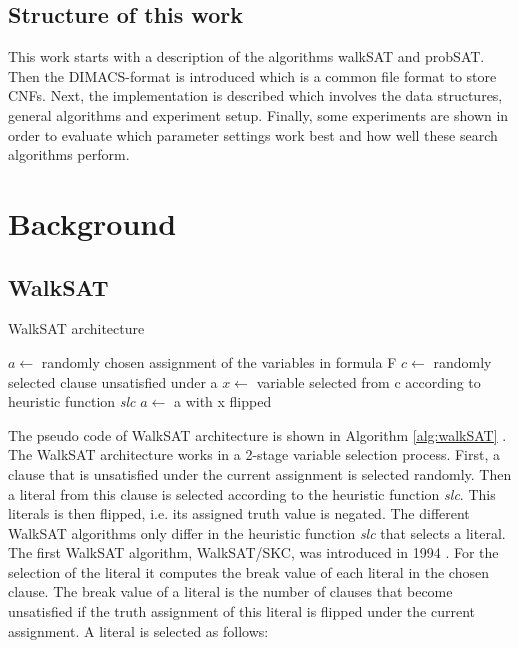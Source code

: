\documentclass[12pt,a4paper]{article}
\begin{document}
\subsection{Structure of this work}
This work starts with a description of the algorithms walkSAT and probSAT. Then the DIMACS-format is introduced which is a common file format to store CNFs. Next, the implementation is described which involves the data structures, general algorithms and experiment setup. Finally, some experiments are shown in order to evaluate which parameter settings work best and how well these search algorithms perform.
\section{Background} \label{s:background}
\subsection{WalkSAT} \label{s:walkSAT}
\begin{algorithm}
  \caption{WalkSAT architecture}
    \label{alg:walkSAT}

  \begin{algorithmic}[1]
      \State $a \leftarrow$ randomly chosen assignment of the variables in formula F
          \State {}
        \EndIf
        \State $c \leftarrow$ randomly selected clause unsatisfied under a
        \State $x \leftarrow$ variable selected from c according to heuristic function \textit{slc}
        \State $a \leftarrow$ a with x flipped
      \EndFor
    \EndFor
    
    \State {}
    \EndProcedure
  \end{algorithmic}
\end{algorithm}
The pseudo code of WalkSAT architecture is shown in Algorithm \ref{alg:walkSAT} \cite{SLS}. The WalkSAT architecture works in a 2-stage variable selection process. First, a clause that is unsatisfied under the current assignment is selected randomly. Then a literal from this clause is selected according to the heuristic function \textit{slc}. This literals is then flipped, i.e. its assigned truth value is negated. The different WalkSAT algorithms only differ in the heuristic function \textit{slc} that selects a literal. The first WalkSAT algorithm, WalkSAT/SKC, was introduced in 1994 \cite{Selman}. For the selection of the literal it computes the break value of each literal in the chosen clause. The break value of a literal is the number of clauses that become unsatisfied if the truth assignment of this literal is flipped under the current assignment. A literal is selected as follows:\\
\end{document}
